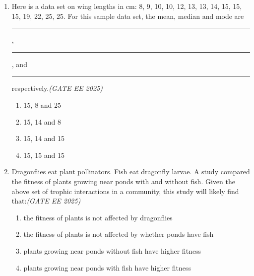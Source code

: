 \documentclass[11pt,a4paper]{article}
\begin{document}
\begin{enumerate}[leftmargin=*,label=\textbf{Q.\arabic*},resume]

\item Here is a data set on wing lengths in cm: 8, 9, 10, 10, 12, 13, 13, 14, 15, 15, 15, 19, 22, 25, 25. For this sample data set, the mean, median and mode are \rule{3cm}{0.15mm}, \rule{3cm}{0.15mm}, and \rule{3cm}{0.15mm} respectively.\hfill \textit{(GATE EE 2025)}
\begin{multicols}{2}
\begin{enumerate}[label=(\Alph*)]
\item 15, 8 and 25
\item 15, 14 and 8
\item 15, 14 and 15
\item 15, 15 and 15
\end{enumerate}
\end{multicols}

\item Dragonflies eat plant pollinators. Fish eat dragonfly larvae. A study compared the fitness of plants growing near ponds with and without fish. Given the above set of trophic interactions in a community, this study will likely find that:\hfill \textit{(GATE EE 2025)}
\begin{multicols}{2}
\begin{enumerate}[label=(\Alph*)]
\item the fitness of plants is not affected by dragonflies
\item the fitness of plants is not affected by whether ponds have fish
\item plants growing near ponds without fish have higher fitness
\item plants growing near ponds with fish have higher fitness
\end{enumerate}
\end{multicols}


\end{enumerate}
\end{document}
